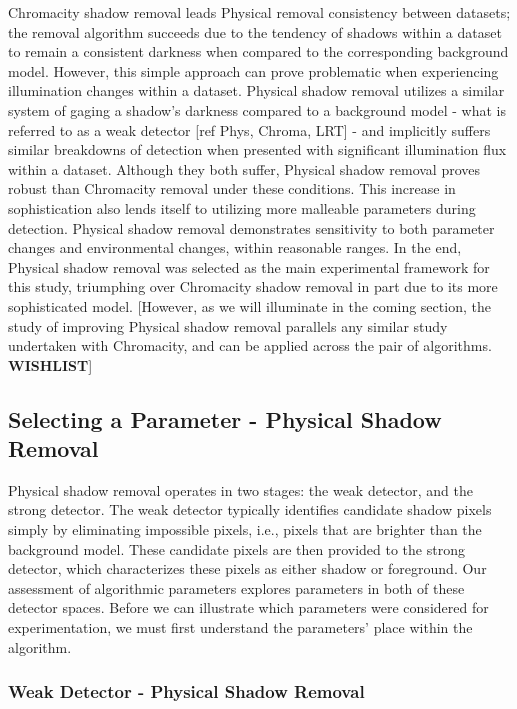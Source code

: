 \documentclass[12pt]{report}
\begin{document}
Chromacity shadow removal leads Physical removal consistency between datasets; the removal algorithm succeeds due to the tendency of shadows within a dataset to remain a consistent darkness when compared to the corresponding background model. However, this simple approach can prove problematic when experiencing illumination changes within a dataset. Physical shadow removal utilizes a similar system of gaging a shadow's darkness compared to a background model - what is referred to as a weak detector [ref Phys, Chroma, LRT] - and implicitly suffers similar breakdowns of detection when presented with significant illumination flux within a dataset. Although they both suffer, Physical shadow removal proves robust than Chromacity removal under these conditions. This increase in sophistication also lends itself to utilizing more malleable parameters during detection. Physical shadow removal demonstrates sensitivity to both parameter changes and environmental changes, within reasonable ranges. In the end, Physical shadow removal was selected as the main experimental framework for this study, triumphing over Chromacity shadow removal in part due to its more sophisticated model. [However, as we will illuminate in the coming section, the study of improving Physical shadow removal parallels any similar study undertaken with Chromacity, and can be applied across the pair of algorithms. \textbf{WISHLIST}]

\subsection{Selecting a Parameter - Physical Shadow Removal}

Physical shadow removal operates in two stages: the weak detector, and the strong detector. The weak detector typically identifies candidate shadow pixels simply by eliminating impossible pixels, i.e., pixels that are brighter than the background model. These candidate pixels are then provided to the strong detector, which characterizes these pixels as either shadow or foreground. Our assessment of algorithmic parameters explores parameters in both of these detector spaces. Before we can illustrate which parameters were considered for experimentation, we must first understand the parameters' place within the algorithm.

\subsubsection{Weak Detector - Physical Shadow Removal}
\end{document}
